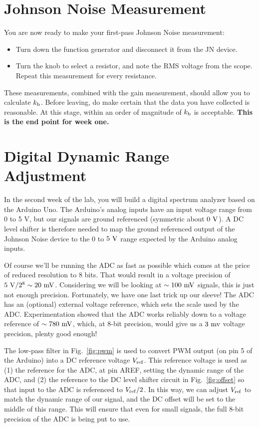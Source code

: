 \documentclass[12pt]{article}
\newcommand{\kb}{k_{\rm b}}
\begin{document}
\section{Johnson Noise Measurement}
You are now ready to make your first-pass Johnson Noise measurement:
\begin{itemize}
\item Turn down the function generator and disconnect it from the JN device.

\item Turn the knob to select a resistor, and note the RMS voltage from the scope.  Repeat this measurement for every resistance.  
\end{itemize}

These measurements, combined with the gain measurement, should allow you to calculate $\kb$.
Before leaving, do make certain that the data you have collected is reasonable.  At this stage, within an order of magnitude of $\kb$ is acceptable.  {\bf This is the end point for week one.}  

\section{Digital Dynamic Range Adjustment}

In the second week of the lab, you will build a digital spectrum analyzer based on the Arduino Uno.
The Arduino's analog inputs have an input voltage range from 0 to 5 V, but our signals are ground referenced (symmetric about $0~\rm V$).  A DC level shifter is therefore needed to map the ground referenced output of the Johnson Noise device to the $0$ to $5~\rm V$ range expected by the Arduino analog inputs.  

Of course we'll be running the ADC as fast as possible which comes at the price of reduced resolution to 8 bits.  That would result in a voltage precision of $5~\rm V/ 2^8 \sim 20~\rm mV$.  Considering we will be looking at $\sim 100~\rm mV$ signals, this is just not enough precision.  Fortunately, we have one last trick up our sleeve!  The ADC has an (optional) external voltage reference, which sets the scale used by the ADC.  Experimentation showed that the ADC works reliably down to a voltage reference of $\sim 780~\rm mV$, which, at 8-bit precision, would give us a $3~\rm mv$ voltage precision, plenty good enough!

The low-pass filter in Fig.~\ref{fig:pwm} is used to convert PWM output (on pin 5 of the Arduino) into a DC reference voltage $V_{\rm ref}$.  This reference voltage is used as (1) the reference for the ADC, at pin AREF, setting the dynamic range of the ADC, and (2) the reference to the DC level shifter circuit in Fig.~\ref{fig:offset} so that input to the ADC is referenced to $V_{\rm ref}/2$.  In this way, we can adjust $V_{\rm ref}$ to match the dynamic range of our signal, and the DC offset will be set to the middle of this range.  This will ensure that even for small signals, the full 8-bit precision of the ADC is being put to use.
\end{document}
